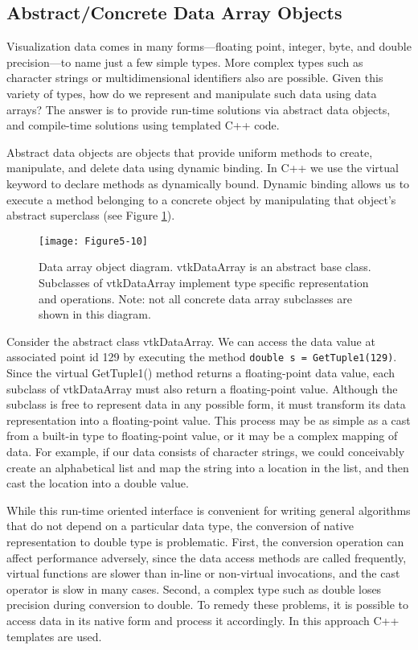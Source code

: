 \subsection{Abstract/Concrete Data Array Objects}

Visualization data comes in many forms—floating point, integer, byte, and double precision—to name just a few simple types. More complex types such as character strings or multidimensional identifiers also are possible. Given this variety of types, how do we represent and manipulate such data using data arrays? The answer is to provide run-time solutions via abstract data objects, and compile-time solutions using templated C++ code.

Abstract data objects are objects that provide uniform methods to create, manipulate, and delete data using dynamic binding. In C++ we use the virtual keyword to declare methods as dynamically bound. Dynamic binding allows us to execute a method belonging to a concrete object by manipulating that object’s abstract superclass (see Figure \ref{fig:Figure5-10}).

\begin{figure}[!htb]
	\centering
	\texttt{[image: Figure5-10]}
	\caption{Data array object diagram. vtkDataArray is an abstract base class. Subclasses of vtkDataArray implement type specific representation and operations. Note: not all concrete data array subclasses are shown in this diagram.}
	\label{fig:Figure5-10}
\end{figure}

Consider the abstract class vtkDataArray. We can access the data value at associated point id 129 by executing the method \texttt{double s = GetTuple1(129)}. Since the virtual GetTuple1() method returns a floating-point data value, each subclass of vtkDataArray must also return a floating-point value. Although the subclass is free to represent data in any possible form, it must transform its data representation into a floating-point value. This process may be as simple as a cast from a built-in type to floating-point value, or it may be a complex mapping of data. For example, if our data consists of character strings, we could conceivably create an alphabetical list and map the string into a location in the list, and then cast the location into a double value.

While this run-time oriented interface is convenient for writing general algorithms that do not depend on a particular data type, the conversion of native representation to double type is problematic. First, the conversion operation can affect performance adversely, since the data access methods are called frequently, virtual functions are slower than in-line or non-virtual invocations, and the cast operator is slow in many cases. Second, a complex type such as double loses precision during conversion to double. To remedy these problems, it is possible to access data in its native form and process it accordingly. In this approach C++ templates are used.

